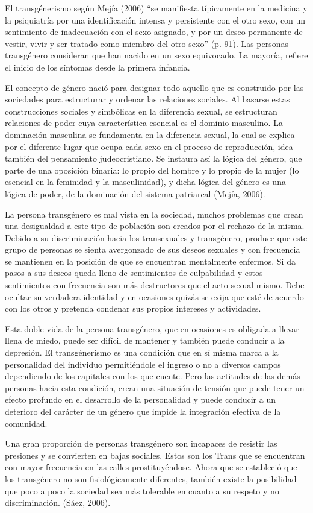 El transgénerismo según Mejía (2006) “se manifiesta típicamente en la medicina y la psiquiatría por una identificación intensa y persistente con el otro sexo, con un sentimiento de inadecuación con el sexo asignado, y por un deseo permanente de vestir, vivir y ser tratado como miembro del otro sexo” (p. 91). Las personas transgénero consideran que han nacido en un sexo equivocado. La mayoría, refiere el inicio de los síntomas desde la primera infancia.

El concepto de género nació para designar todo aquello que es construido por las sociedades para estructurar y ordenar las relaciones sociales. Al basarse estas construcciones sociales y simbólicas en la diferencia sexual, se estructuran relaciones de poder cuya característica esencial es el dominio masculino. La dominación masculina se fundamenta en la diferencia sexual, la cual se explica por el diferente lugar que ocupa cada sexo en el proceso de reproducción, idea también del pensamiento judeocristiano. Se instaura así la lógica del género, que parte de una oposición binaria: lo propio del hombre y lo propio de la mujer (lo esencial en la feminidad y la masculinidad), y dicha lógica del género es una lógica de poder, de la dominación del sistema patriarcal (Mejía, 2006).

La persona transgénero es mal vista en la sociedad, muchos problemas que crean una desigualdad a este tipo de población son creados  por el rechazo de la misma. Debido a su discriminación hacia los transexuales y transgénero, produce que este grupo de personas se sienta avergonzado de sus deseos sexuales y con frecuencia se mantienen en la posición de que se encuentran mentalmente enfermos. Si da pasos a sus deseos queda lleno de sentimientos de culpabilidad y estos sentimientos con frecuencia son más destructores que el acto sexual mismo. Debe ocultar su verdadera identidad y en ocasiones quizás se exija que esté de acuerdo con los otros y pretenda condenar sus propios intereses y actividades.

Esta doble vida de la persona transgénero, que en ocasiones es obligada a llevar llena de miedo, puede ser difícil de mantener y también puede conducir a la depresión. El transgénerismo es una condición que en sí misma marca a la personalidad del individuo permitiéndole el ingreso o no a diversos campos dependiendo de los capitales con los que cuente. Pero las actitudes de las demás personas hacia esta condición, crean una situación de tensión que puede tener un efecto profundo en el desarrollo de la personalidad y puede conducir a un deterioro del carácter de un género que impide la integración efectiva de la comunidad.

Una gran proporción de personas transgénero son incapaces de resistir las presiones y se convierten en bajas sociales. Estos son los Trans que se encuentran con mayor frecuencia en las calles prostituyéndose. Ahora que se estableció que los transgénero no son fisiológicamente diferentes, también existe la posibilidad que poco a poco la sociedad sea más tolerable en cuanto a su respeto y no discriminación. (Sáez, 2006).